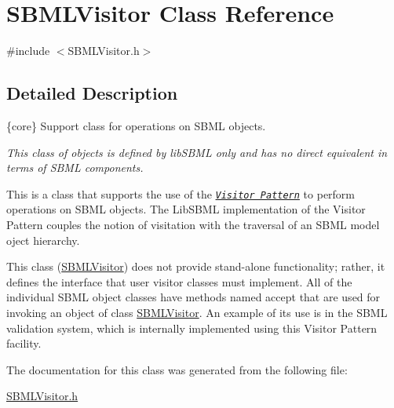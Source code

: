 \hypertarget{class_s_b_m_l_visitor}{}\section{S\+B\+M\+L\+Visitor Class Reference}
\label{class_s_b_m_l_visitor}


{\ttfamily \#include $<$S\+B\+M\+L\+Visitor.\+h$>$}



\subsection{Detailed Description}
\{core\} Support class for operations on S\+B\+ML objects.

{\itshape This class of objects is defined by lib\+S\+B\+ML only and has no direct equivalent in terms of S\+B\+ML components.}

This is a class that supports the use of the \href{http://en.wikipedia.org/wiki/Design_pattern_(computer_science)}{\tt {\itshape Visitor Pattern}} to perform operations on S\+B\+ML objects. The Lib\+S\+B\+ML implementation of the Visitor Pattern couples the notion of visitation with the traversal of an S\+B\+ML model oject hierarchy.

This class (\hyperlink{class_s_b_m_l_visitor}{S\+B\+M\+L\+Visitor}) does not provide stand-\/alone functionality; rather, it defines the interface that user visitor classes must implement. All of the individual S\+B\+ML object classes have methods named {\ttfamily accept} that are used for invoking an object of class \hyperlink{class_s_b_m_l_visitor}{S\+B\+M\+L\+Visitor}. An example of its use is in the S\+B\+ML validation system, which is internally implemented using this Visitor Pattern facility. 

The documentation for this class was generated from the following file\+:\begin{DoxyCompactItemize}
\item 
\hyperlink{_s_b_m_l_visitor_8h}{S\+B\+M\+L\+Visitor.\+h}\end{DoxyCompactItemize}
